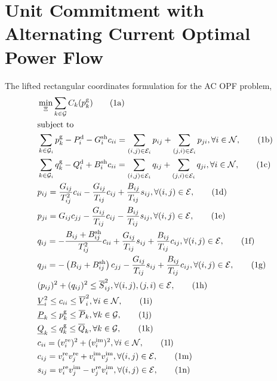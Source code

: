 \documentclass[11pt,twoside]{article}
\begin{document}
\section{Unit Commitment with Alternating Current Optimal Power Flow}
The lifted rectangular coordinates formulation for the AC OPF problem,
\begin{subequations}
	\begin{align}
		& \min_{\Xi} \sum_{k \in \mathcal{G}} C_k(p_k^{\text{g}}) \tag{1a} \\
		& \text{subject to} \notag \\
		& \sum_{k \in \mathcal{G}_i} p_k^{\text{g}} - P_i^{\text{d}} - G_i^{\text{sh}} c_{ii} = \sum_{(i,j) \in \mathcal{E}_i} p_{ij} + \sum_{(j,i) \in \mathcal{E}_i} p_{ji}, \forall i \in \mathcal{N}, \tag{1b} \\
		& \sum_{k \in \mathcal{G}_i} q_k^{\text{g}} - Q_i^{\text{d}} + B_i^{\text{sh}} c_{ii} = \sum_{(i,j) \in \mathcal{E}_i} q_{ij} + \sum_{(j,i) \in \mathcal{E}_i} q_{ji}, \forall i \in \mathcal{N}, \tag{1c} \\
		& p_{ij} = \frac{G_{ij}}{T_{ij}^2} c_{ii} - \frac{G_{ij}}{T_{ij}} c_{ij} + \frac{B_{ij}}{T_{ij}} s_{ij}, \forall (i, j) \in \mathcal{E}, \tag{1d} \\
		& p_{ji} = G_{ij} c_{jj} - \frac{G_{ij}}{T_{ij}} c_{ij} - \frac{B_{ij}}{T_{ij}} s_{ij}, \forall (i, j) \in \mathcal{E}, \tag{1e} \\
		& q_{ij} = -\frac{B_{ij} + B_{ij}^{\text{sh}}}{T_{ij}^2} c_{ii} + \frac{G_{ij}}{T_{ij}} s_{ij} + \frac{B_{ij}}{T_{ij}} c_{ij}, \forall (i, j) \in \mathcal{E}, \tag{1f} \\
		& q_{ji} = -\left( B_{ij} + B_{ij}^{\text{sh}} \right) c_{jj} - \frac{G_{ij}}{T_{ij}} s_{ij} + \frac{B_{ij}}{T_{ij}} c_{ij}, \forall (i, j) \in \mathcal{E}, \tag{1g} \\
		& (p_{ij})^2 + (q_{ij})^2 \leq \overline{S}_{ij}^2, \forall (i, j), (j, i) \in \mathcal{E}, \tag{1h} \\
		& \underline{V}_i^2 \leq c_{ii} \leq \overline{V}_i^2, \forall i \in \mathcal{N}, \tag{1i} \\
		& \underline{P}_k \leq p_k^{\text{g}} \leq \overline{P}_k, \forall k \in \mathcal{G}, \tag{1j} \\
		& \underline{Q}_k \leq q_k^{\text{g}} \leq \overline{Q}_k, \forall k \in \mathcal{G}, \tag{1k} \\
		& c_{ii} = (v_i^{\text{re}})^2 + (v_i^{\text{im}})^2, \forall i \in \mathcal{N}, \tag{1l} \\
		& c_{ij} = v_i^{\text{re}} v_j^{\text{re}} + v_i^{\text{im}} v_j^{\text{im}}, \forall (i, j) \in \mathcal{E}, \tag{1m} \\
		& s_{ij} = v_i^{\text{re}} v_j^{\text{im}} - v_j^{\text{re}} v_i^{\text{im}}, \forall (i, j) \in \mathcal{E}, \tag{1n}
	\end{align}
\end{subequations}
\end{document}
